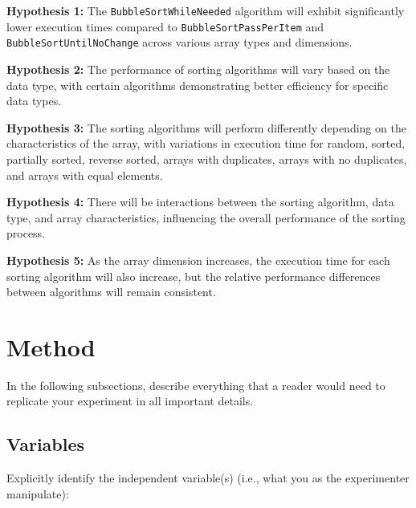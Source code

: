 \documentclass{article}
\begin{document}
\begin{tcolorbox}[title=Hypotheses:, colback=white, colframe=black, arc=0pt, outer arc=0pt]
    \textbf{Hypothesis 1:} The \texttt{BubbleSortWhileNeeded} algorithm will exhibit significantly lower execution times compared to \texttt{BubbleSortPassPerItem} and \texttt{BubbleSortUntilNoChange} across various array types and dimensions.
    
    \textbf{Hypothesis 2:} The performance of sorting algorithms will vary based on the data type, with certain algorithms demonstrating better efficiency for specific data types.
    
    \textbf{Hypothesis 3:} The sorting algorithms will perform differently depending on the characteristics of the array, with variations in execution time for random, sorted, partially sorted, reverse sorted, arrays with duplicates, arrays with no duplicates, and arrays with equal elements.
    
    \textbf{Hypothesis 4:} There will be interactions between the sorting algorithm, data type, and array characteristics, influencing the overall performance of the sorting process.
    
    \textbf{Hypothesis 5:} As the array dimension increases, the execution time for each sorting algorithm will also increase, but the relative performance differences between algorithms will remain consistent.
\end{tcolorbox}


\section{Method}
In the following subsections, describe everything that a reader would need to replicate your experiment in all important details.
\subsection{Variables}
Explicitly identify the independent variable(s) (i.e., what you as the experimenter manipulate): 
\end{document}
